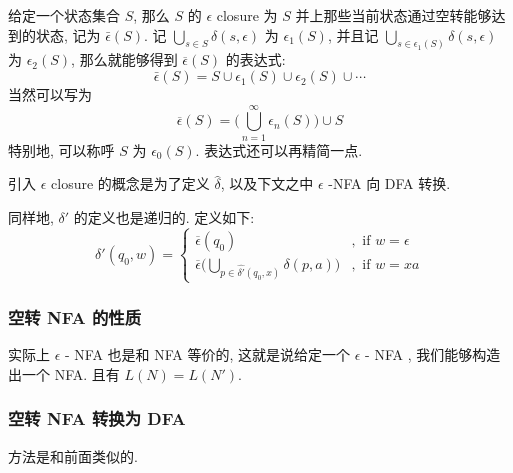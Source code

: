 \documentclass[../main.tex]{subfiles}
\begin{document}
\begin{exam}
\end{exam}

\begin{definition}
给定一个状态集合 \(S\), 那么 \(S\) 的 \(\epsilon\) closure 为 \(S\) 并上那些当前状态通过空转能够达到的状态, 记为 \(\bar{\epsilon} (S)\). 记 \(\bigcup_{s \in S} \delta (s , \epsilon ) \) 为 \(\epsilon _{1} (S)\), 并且记 \(\bigcup_{s \in \epsilon _{1} (S)} \delta (s, \epsilon )\) 为 \(\epsilon _{2} (S) \), 那么就能够得到 \(\overline{\epsilon} (S)\) 的表达式: 
\begin{equation}
\bar\epsilon (S) = S \cup \epsilon_{1} (S) \cup \epsilon_{2	} (S) \cup \cdots
\end{equation}
当然可以写为 
\begin{equation}
\overline{\epsilon} (S)  = \big(\bigcup_{n = 1} ^{ \infty}\epsilon_{n} (S) \big) \cup S
\end{equation}
特别地, 可以称呼 \(S\) 为 \(\epsilon_{0} (S)\). 表达式还可以再精简一点. 
\end{definition}

引入 \(\epsilon\) closure 的概念是为了定义 \(\hat{\delta}\), 以及下文之中 \(\epsilon\) -NFA 向 DFA 转换. 
\begin{definition}
同样地, \(\delta'\) 的定义也是递归的. 定义如下: 
\begin{equation}
\delta' (q_{0}, w) = 
\begin{cases}
\overline{\epsilon} (q_{0}) &, \text{ if } w = \epsilon \\
\overline{\epsilon} \big(\bigcup_{p\in \hat{\delta'}(q _{0}, x)} \delta (p,a)\big) &, \text{ if } w = xa
\end{cases}
\end{equation}
\end{definition}

\subsubsection{空转 NFA 的性质}
实际上 \(\epsilon\) - NFA 也是和 NFA 等价的, 这就是说给定一个 \(\epsilon\) - NFA , 我们能够构造出一个 NFA. 且有 \(L (N )  = L (N ' ) \). 
\begin{thm} 
\end{thm}
\subsubsection{空转 NFA 转换为 DFA}
方法是和前面类似的. %
\end{document}
